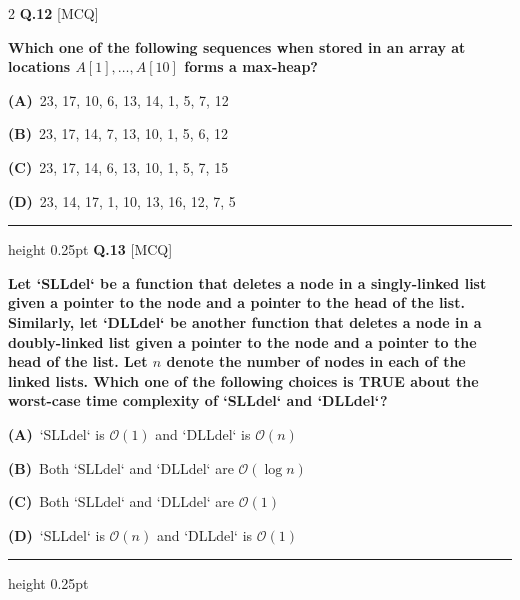 \documentclass[a4paper,10pt,twoside]{article}
\begin{document}
\begin{multicols}{2}
\noindent\textbf{Q.12} \hfill {\footnotesize\textsf{[MCQ]}}
\par\vspace{2pt}
{\bfseries Which one of the following sequences when stored in an array at locations $A[1], \dots, A[10]$ forms a max-heap? \par}
\par\vspace{2pt}\noindent
\textbf{(A)}~23, 17, 10, 6, 13, 14, 1, 5, 7, 12\par\vspace{2pt}\noindent
\textbf{(B)}~23, 17, 14, 7, 13, 10, 1, 5, 6, 12\par\vspace{2pt}\noindent
\textbf{(C)}~23, 17, 14, 6, 13, 10, 1, 5, 7, 15\par\vspace{2pt}\noindent
\textbf{(D)}~23, 14, 17, 1, 10, 13, 16, 12, 7, 5
\par\vspace{6pt}\hrule height 0.25pt\vspace{6pt}
\noindent\textbf{Q.13} \hfill {\footnotesize\textsf{[MCQ]}}
\par\vspace{2pt}
{\bfseries Let `SLLdel` be a function that deletes a node in a singly-linked list given a pointer to the node and a pointer to the head of the list. Similarly, let `DLLdel` be another function that deletes a node in a doubly-linked list given a pointer to the node and a pointer to the head of the list.
Let $n$ denote the number of nodes in each of the linked lists. Which one of the following choices is TRUE about the worst-case time complexity of `SLLdel` and `DLLdel`? \par}
\par\vspace{2pt}\noindent
\textbf{(A)}~`SLLdel` is $\mathcal{O}(1)$ and `DLLdel` is $\mathcal{O}(n)$\par\vspace{2pt}\noindent
\textbf{(B)}~Both `SLLdel` and `DLLdel` are $\mathcal{O}(\log n)$\par\vspace{2pt}\noindent
\textbf{(C)}~Both `SLLdel` and `DLLdel` are $\mathcal{O}(1)$\par\vspace{2pt}\noindent
\textbf{(D)}~`SLLdel` is $\mathcal{O}(n)$ and `DLLdel` is $\mathcal{O}(1)$
\par\vspace{6pt}\hrule height 0.25pt\vspace{6pt}

\end{multicols}
\end{document}
